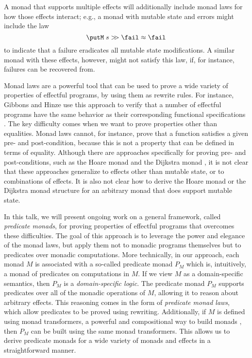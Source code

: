 \documentclass[preprint]{sigplanconf}
\begin{document}
A monad that supports multiple effects will additionally include monad laws for
how those effects interact; e.g., a monad with mutable state and errors might
include the law
\[
\putM\;s \bindU \fail \lreq \fail
\]
to indicate that a failure eradicates all mutable state modifications.  A
similar monad with these effects, however, might not satisfy this law, if, for
instance, failures can be recovered from.


Monad laws are a powerful tool that can be used to prove a wide variety of
properties of effectful programs, by using them as rewrite rules. For instance,
Gibbons and Hinze use this approach to verify that a number of effectful
programs have the same behavior as their corresponding functional specifications
\cite{gibbons11}.
%
The key difficulty comes when we want to prove properties other than equalities.
Monad laws cannot, for instance, prove that a function satisfies a given pre-
and post-condition, because this is not a property that can be defined in terms
of equality. Although there are approaches specifically for proving pre- and
post-conditions, such as the Hoare monad \cite{nanevski08} and the Dijkstra
monad \cite{swamy13}, it is not clear that these approaches generalize to
effects other than mutable state, or to combinations of effects.
It is also not clear how to derive the Hoare monad or the Dijkstra monad
structure for an arbitrary monad that does support mutable state.


In this talk, we will present ongoing work on a general framework, called
\emph{predicate monads}, for proving properties of effectful programs that
overcomes these difficulties. The goal of this approach is to leverage the power
and elegance of the monad laws, but apply them not to monadic programs
themselves but to predicates over monadic computations.  More technically, in
our approach, each monad $M$ is associated with a so-called predicate monad $P_M$
which is, intuitively, a monad of predicates on computations in $M$.
If we view $M$ as a domain-specific semantics, then $P_M$ is a
\emph{domain-specific logic}.
The predicate monad $P_M$ supports predicates over all of the monadic operations
of $M$, allowing it to reason about arbitrary effects. This reasoning comes in
the form of \emph{predicate monad laws}, which allow predicates to be proved
using rewriting. Additionally, if $M$ is defined using monad transformers, a
powerful and compositional way to build monads \cite{liang95}, then $P_M$ can be
built using the same monad transformers. This allows us to derive predicate
monads for a wide variety of monads and effects in a straightforward manner.
\end{document}
